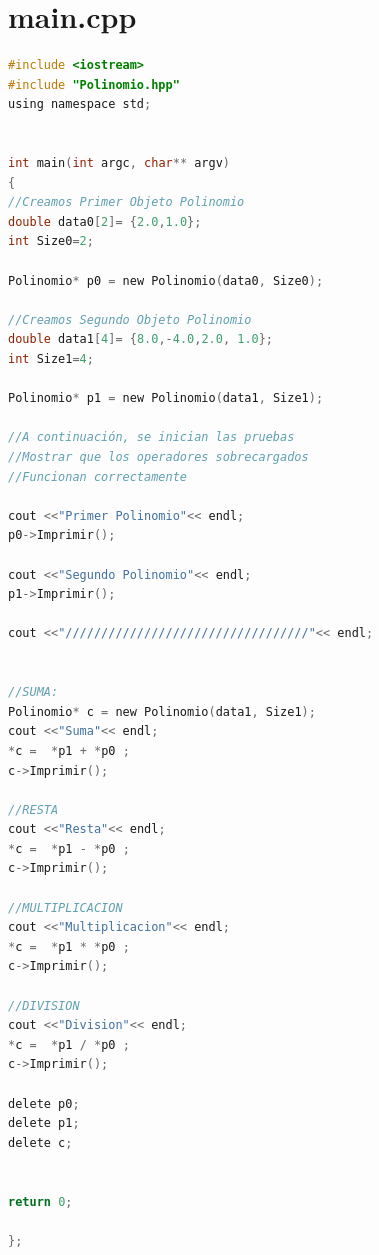 \documentclass[11pt]{article}
\begin{document}
\section{main.cpp}
\begin{lstlisting}[language=C]
#include <iostream>
#include "Polinomio.hpp"
using namespace std;


int main(int argc, char** argv)
{
//Creamos Primer Objeto Polinomio
double data0[2]= {2.0,1.0};
int Size0=2;

Polinomio* p0 = new Polinomio(data0, Size0);

//Creamos Segundo Objeto Polinomio
double data1[4]= {8.0,-4.0,2.0, 1.0};
int Size1=4;

Polinomio* p1 = new Polinomio(data1, Size1);

//A continuación, se inician las pruebas 
//Mostrar que los operadores sobrecargados
//Funcionan correctamente

cout <<"Primer Polinomio"<< endl; 
p0->Imprimir();

cout <<"Segundo Polinomio"<< endl; 
p1->Imprimir();

cout <<"//////////////////////////////////"<< endl; 
 

//SUMA:
Polinomio* c = new Polinomio(data1, Size1);
cout <<"Suma"<< endl;
*c =  *p1 + *p0 ;
c->Imprimir();

//RESTA
cout <<"Resta"<< endl;
*c =  *p1 - *p0 ;
c->Imprimir();

//MULTIPLICACION
cout <<"Multiplicacion"<< endl;
*c =  *p1 * *p0 ;
c->Imprimir();

//DIVISION
cout <<"Division"<< endl;
*c =  *p1 / *p0 ;
c->Imprimir();

delete p0;
delete p1;
delete c;


return 0;

};

\end{lstlisting}
\end{document}

